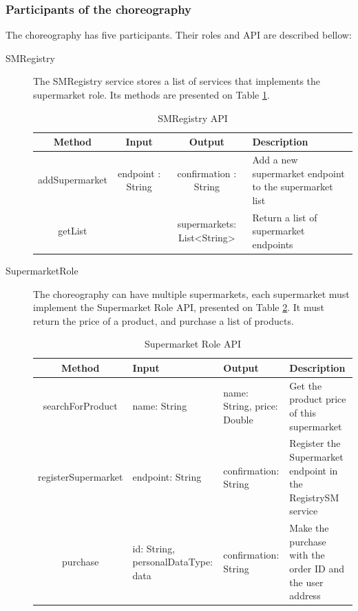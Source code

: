 \subsubsection{Participants of the choreography}
\label{participantschoreography}

The choreography has five participants. Their roles and API are described bellow:
\begin{description}
\item[SMRegistry] The SMRegistry service stores a list of services that implements the supermarket role. Its methods are presented on Table \ref{smregistryapi}.
	\begin{table}[htdp]
	\caption{SMRegistry API}
	\begin{center}
	\begin{tabular}{|c|c|c|m{4cm}|}
		\hline
		Method & Input & Output & Description \\ \hline
		addSupermarket & endpoint : String & confirmation : String & Add a new supermarket endpoint to the supermarket list \\ \hline
		getList & & supermarkets: List<String> & Return a list of supermarket endpoints \\ \hline
	\end{tabular}
	\end{center}
	\label{smregistryapi}
	\end{table}%

\item[SupermarketRole] The choreography can have multiple supermarkets, each supermarket must implement the Supermarket Role API, presented on Table \ref{smroleapi}. It must return the price of a product, and purchase a list of products.
	\begin{table}[htdp]
	\caption{Supermarket Role API}
	\begin{center}
	\begin{tabular}{|c|m{3.5cm}|m{3.5cm}|m{4cm}|}
		\hline
		Method				& Input						& Output 					& Description \\ \hline
		searchForProduct 		& name: String					& name: String, price: Double 	& Get the product price of this supermarket \\ \hline
		registerSupermarket		& endpoint: String				& confirmation: String		& Register the Supermarket endpoint in the RegistrySM service \\ \hline
		purchase				& id: String, personalDataType: data & confirmation: String		& Make the purchase with the order ID and the user address \\ \hline
	\end{tabular}
	\end{center}
	\label{smroleapi}
	\end{table}%
	

\end{description}
